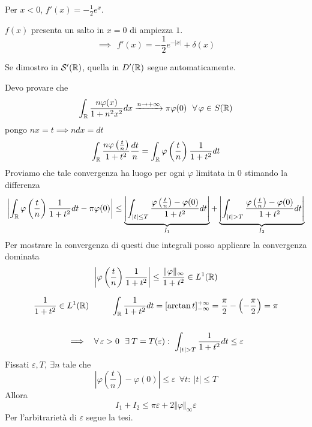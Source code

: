 Per $x < 0$, $f'(x) = - \frac{1}{2} e^{x}$.

$f(x)$ presenta un salto in $x = 0$ di ampiezza $1$.
\begin{equation*}
\implies \ \ f'(x) = - \frac{1}{2} e^{- | x|} + \delta (x)
\end{equation*}
\Soluzione


Se dimostro in $\mathcal{S}  '(\mathbb{R})$, quella in $D'(\mathbb{R})$ segue automaticamente.

Devo provare che
\begin{equation*}
\int_{\RR}\frac{n\varphi (x)}{1 + n^{2} x^{2}} dx\xrightarrow{n\rightarrow + \infty} \pi \varphi (0) \ \ \forall \varphi \in S(\RR)
\end{equation*}
pongo $nx = t\implies ndx = dt$
\begin{equation*}
\int_{\mathbb{R}}\frac{n\varphi \left(\frac{t}{n}\right)}{1 + t^{2}}\frac{dt}{n} = \int_{\mathbb{R}} \varphi \left(\frac{t}{n}\right)\frac{1}{1 + t^{2}} dt
\end{equation*}
Proviamo che tale convergenza ha luogo per ogni $\varphi $ limitata in $0$ stimando la differenza
\begin{equation*}
\left| \int_{\mathbb{R}} \varphi \left(\frac{t}{n}\right)\frac{1}{1 + t^{2}} dt - \pi \varphi (0)\right| \leq \underbrace{\left| \int_{| t| \leq T}\frac{\varphi \left(\frac{t}{n}\right) - \varphi (0)}{1 + t^{2}} dt\right|}_{I_{1}} + \underbrace{\left| \int_{| t|  > T}\frac{\varphi \left(\frac{t}{n}\right) - \varphi (0)}{1 + t^{2}} dt\right|}_{I_{2}}
\end{equation*}
Per mostrare la convergenza di questi due integrali posso applicare la convergenza dominata
\begin{equation*}
\left| \varphi \left(\frac{t}{n}\right)\frac{1}{1 + t^{2}}\right| \leq \frac{\Vert \varphi \Vert_{\infty}}{1 + t^{2}} \in L^{1}(\mathbb{R})
\end{equation*}
\begin{rem}
\begin{gather*}
\frac{1}{1 + t^{2}} \in L^{1}(\RR) \ \ \ \ \ \ \ \ \int_{\RR}\frac{1}{1 + t^{2}} dt = [\arctan t]^{+ \infty}_{- \infty} = \frac{\pi}{2} - \left(- \frac{\pi}{2}\right) = \pi \\
\\
\implies \ \ \forall \varepsilon  > 0\ \ \exists T = T(\varepsilon) :\ \int_{| t|  > T}\frac{1}{1 + t^{2}} dt \leq \varepsilon 
\end{gather*}
Fissati $\varepsilon, T, \ \exists n$ tale che
\begin{equation*}
\left| \varphi \left(\frac{t}{n}\right) - \varphi (0)\right| \leq \varepsilon \ \ \forall t:\ | t| \leq T
\end{equation*}
Allora
\begin{equation*}
I_{1} + I_{2} \leq \pi \varepsilon + 2\Vert \varphi \Vert_{\infty} \varepsilon 
\end{equation*}
Per l'arbitrarietà di $\varepsilon $ segue la tesi.
\end{rem}
\Soluzione

